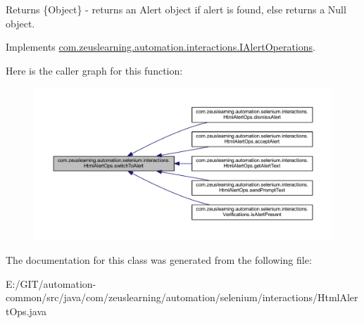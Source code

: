 \begin{DoxyReturn}{Returns}
\{Object\} -\/ returns an {\ttfamily Alert} object if alert is found, else returns a {\ttfamily Null} object. 
\end{DoxyReturn}


Implements \hyperlink{interfacecom_1_1zeuslearning_1_1automation_1_1interactions_1_1IAlertOperations_a8f0851a83f41aef25635fb1b32f15c08}{com.\+zeuslearning.\+automation.\+interactions.\+I\+Alert\+Operations}.

Here is the caller graph for this function\+:\nopagebreak
\begin{figure}[H]
\begin{center}
\leavevmode
\includegraphics[width=350pt]{d9/d71/classcom_1_1zeuslearning_1_1automation_1_1selenium_1_1interactions_1_1HtmlAlertOps_a60bf8794a0914518cf2c670b478fb6c6_icgraph}
\end{center}
\end{figure}


The documentation for this class was generated from the following file\+:\begin{DoxyCompactItemize}
\item 
E\+:/\+G\+I\+T/automation-\/common/src/java/com/zeuslearning/automation/selenium/interactions/Html\+Alert\+Ops.\+java\end{DoxyCompactItemize}
